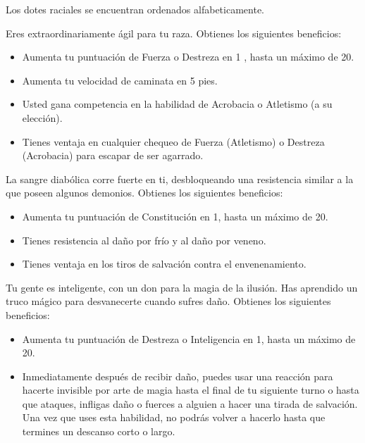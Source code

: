 \documentclass[a4paper,twocolumn,openany,10pt]{dndbook}
\begin{document}
Los dotes raciales se encuentran ordenados alfabeticamente.

Eres extraordinariamente ágil para tu raza. Obtienes los siguientes beneficios:
\begin{itemize}
\item Aumenta tu puntuación de Fuerza o Destreza en 1 , hasta un máximo de 20.
\item Aumenta tu velocidad de caminata en 5 pies.
\item Usted gana competencia en la habilidad de Acrobacia o Atletismo (a su elección).
\item Tienes ventaja en cualquier chequeo de Fuerza (Atletismo) o Destreza (Acrobacia) para escapar de ser agarrado.
\end{itemize}

La sangre diabólica corre fuerte en ti, desbloqueando una resistencia similar a la que poseen algunos demonios. Obtienes los
siguientes beneficios:
\begin{itemize}
\item Aumenta tu puntuación de Constitución en 1, hasta un máximo de 20.
\item Tienes resistencia al daño por frío y al daño por veneno.
\item Tienes ventaja en los tiros de salvación contra el envenenamiento. 
\end{itemize}

Tu gente es inteligente, con un don para la magia de la ilusión. Has aprendido un truco mágico para desvanecerte cuando sufres
daño. Obtienes los siguientes beneficios:
\begin{itemize}
\item Aumenta tu puntuación de Destreza o Inteligencia en 1, hasta un máximo de 20.
\item Inmediatamente después de recibir daño, puedes usar una reacción para hacerte invisible por arte de magia hasta el final
de tu siguiente turno o hasta que ataques, infligas daño o fuerces a alguien a hacer una tirada de salvación. Una vez que uses
esta habilidad, no podrás volver a hacerlo hasta que termines un descanso corto o largo.
\end{itemize}
 
\end{document}
